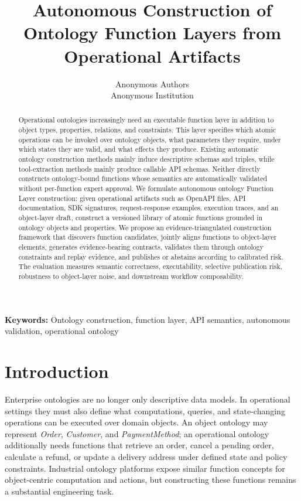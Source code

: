 \documentclass[10pt,twocolumn]{article}
\title{Autonomous Construction of Ontology Function Layers from Operational Artifacts}
\author{Anonymous Authors\\Anonymous Institution}
\providecommand{\keywords}[1]{\par\smallskip\noindent\textbf{Keywords: }#1\par}
\begin{document}
\maketitle

\begin{abstract}
Operational ontologies increasingly need an executable function layer in addition to object types, properties, relations, and constraints. This layer specifies which atomic operations can be invoked over ontology objects, what parameters they require, under which states they are valid, and what effects they produce. Existing automatic ontology construction methods mainly induce descriptive schemas and triples, while tool-extraction methods mainly produce callable API schemas. Neither directly constructs ontology-bound functions whose semantics are automatically validated without per-function expert approval. We formulate autonomous ontology Function Layer construction: given operational artifacts such as OpenAPI files, API documentation, SDK signatures, request-response examples, execution traces, and an object-layer draft, construct a versioned library of atomic functions grounded in ontology objects and properties. We propose an evidence-triangulated construction framework that discovers function candidates, jointly aligns functions to object-layer elements, generates evidence-bearing contracts, validates them through ontology constraints and replay evidence, and publishes or abstains according to calibrated risk. The evaluation measures semantic correctness, executability, selective publication risk, robustness to object-layer noise, and downstream workflow composability.
\end{abstract}

\keywords{Ontology construction, function layer, API semantics, autonomous validation, operational ontology}

\section{Introduction}
Enterprise ontologies are no longer only descriptive data models. In operational settings they must also define what computations, queries, and state-changing operations can be executed over domain objects. An object ontology may represent \textit{Order}, \textit{Customer}, and \textit{PaymentMethod}; an operational ontology additionally needs functions that retrieve an order, cancel a pending order, calculate a refund, or update a delivery address under defined state and policy constraints. Industrial ontology platforms expose similar function concepts for object-centric computation and actions, but constructing these functions remains a substantial engineering task.
\end{document}

